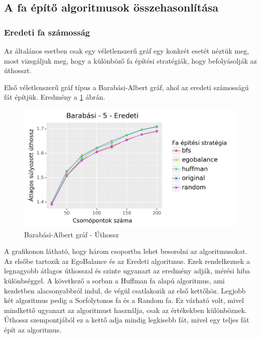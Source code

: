 \documentclass[12pt]{report}
\begin{document}
\subsection{A fa építő algoritmusok összehasonlítása}

\subsubsection{Eredeti fa számosság}

Az általános esetben csak egy véletlenszerű gráf egy konkrét esetét néztük meg, most vizsgáljuk meg, hogy a különböző fa építési stratégiák, hogy befolyásolják az úthosszt.

Első véletlenszerű gráf típus a Barabási-Albert gráf, ahol az eredeti számosságú fát építjük. 
Eredmény a \ref{barabasi-len} ábrán.

\begin{figure}[H]
	\begin{center}
		\includegraphics[width=0.9\linewidth]{pictures/barabasi_len_e.png}
		\caption{Barabási-Albert gráf - Úthossz}
		\label{barabasi-len}
	\end{center}
\end{figure}

A grafikonon látható, hogy három csoportba lehet besorolni az algoritmusokat. 
Az elsőbe tartozik az EgoBalance és az Eredeti algoritmus.
Ezek rendelkeznek a legnagyobb átlagos úthosszal és szinte ugyanazt az eredmény adják, mérési hiba különbséggel.
A következő a sorban a Huffman fa alapú algoritmus, ami kezdetben alacsonyabbról indul, de végül csatlakozik az első kettőhöz.
Legjobb két algoritmus pedig a Sorfolytonos fa és a Random fa.
Ez várható volt, mivel mindkettő ugyanazt az algoritmust használja, csak az értékekben különböznek.
Úthossz szempontjából ez a kettő adja mindig legkisebb fát, mivel egy teljes fát épít az algoritmus.
\end{document}
